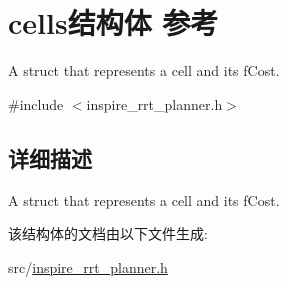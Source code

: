 \hypertarget{structcells}{\section{cells结构体 参考}
\label{structcells}
}


A struct that represents a cell and its f\-Cost.  




{\ttfamily \#include $<$inspire\-\_\-rrt\-\_\-planner.\-h$>$}



\subsection{详细描述}
A struct that represents a cell and its f\-Cost. 

该结构体的文档由以下文件生成\-:\begin{DoxyCompactItemize}
\item 
src/\hyperlink{inspire__rrt__planner_8h}{inspire\-\_\-rrt\-\_\-planner.\-h}\end{DoxyCompactItemize}
